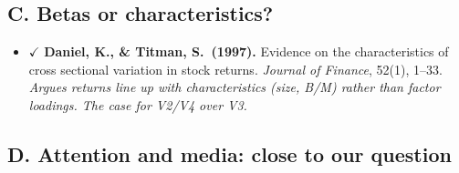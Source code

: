 \documentclass[11pt]{article}
\begin{document}
\subsection*{C. Betas or characteristics?}
\begin{itemize}
  \item $\checkmark$ \textbf{Daniel, K., \& Titman, S.\ (1997).} Evidence on the characteristics of cross sectional variation in stock returns. \emph{Journal of Finance}, 52(1), 1--33.\\
  \textit{Argues returns line up with characteristics (size, B/M) rather than factor loadings. The case for V2/V4 over V3.}
\end{itemize}

\subsection*{D. Attention and media: close to our question}
\end{document}
